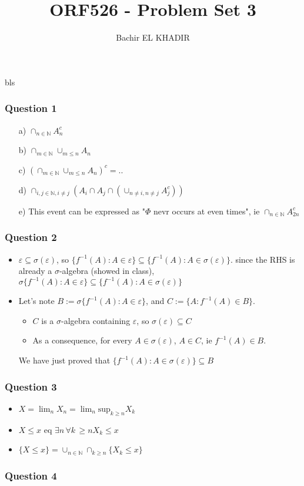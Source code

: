 \documentclass[12pt]{article}
\title{ORF526 - Problem Set 3}
\author{Bachir EL KHADIR }
\newcommand{\Q}[1]{\subsubsection*{Question #1}}
\newcommand{\salgebra}{$\sigma$-algebra }
\begin{document}
\maketitle
bls
\Q{1}

\begin{itemize}
\item [a)] $\cap_{n \in \mathbb{N}} A_n^c$
\item [b)] $\cap_{m \in \mathbb{N}} \cup_{m \leq n} A_n$
\item [c)] $\left(\cap_{m \in \mathbb{N}} \cup_{m \leq n} A_n \right)^c = ..$
\item [d)] $\cap_{ i,j \in \mathbb{N}, i \neq j} \left(A_i \cap A_j \cap (\cup_{n \neq i, n \neq j} A_j^c) \right)$
\item [e)] This event can be expressed as "$\Phi$ nevr occurs at even times", ie $\cap_{n \in \mathbb{N}} A_{2 n}^c$
\end{itemize}

\Q{2}
\begin{itemize}
\item $\varepsilon \subseteq \sigma(\varepsilon)$, so $\{ f^{-1}(A) : A \in \varepsilon \} \subseteq \{ f^{-1}(A) : A \in \sigma(\varepsilon) \}$. since the RHS is already a $\sigma$-algebra (showed in class), $\sigma \{ f^{-1}(A) : A \in \varepsilon \} \subseteq \{ f^{-1}(A) : A \in \sigma(\varepsilon) \}$
\item Let's note $B := \sigma \{ f^{-1}(A) : A \in \varepsilon \}$, and $C := \{ A: f^{-1}(A) \in B \}$.
\begin{itemize}
\item $C$ is a \salgebra containing $\varepsilon$, so $\sigma(\varepsilon) \subseteq C$
\item As a consequence, for every $A \in \sigma(\varepsilon)$, $A \in C$, ie $f^{-1}(A) \in B$.
\end{itemize}
We have just proved that $\{ f^{-1}(A) : A \in \sigma(\varepsilon) \}  \subseteq B$
\end{itemize}


\Q{3} 
\begin{itemize}
\item $X = \lim_n X_n = \lim_n \text{sup}_{k \geq n} X_k$
\item $X \leq x$ eq $\exists n \, \forall k \, \geq n X_k \leq x$
\item $\{X \leq x\} = \cup_{n \in \mathbb{N}} \cap_{k \geq n} \{X_k \leq x \}$
\end{itemize}

\Q{4}
\end{document}
